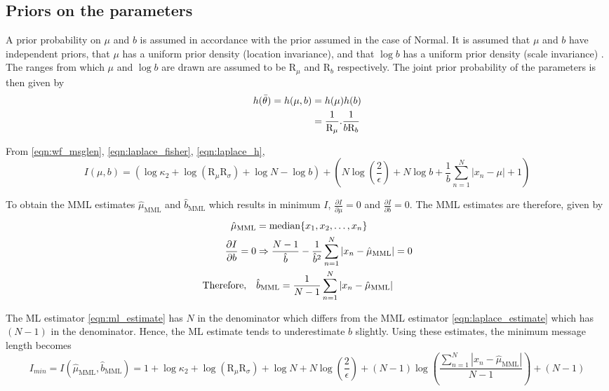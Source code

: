 \documentclass[wcp]{jmlr}
\begin{document}
\subsection*{Priors on the parameters}
A prior probability on $\mu$ and $b$ is assumed in accordance with the prior assumed
in the case of Normal. It is assumed that $\mu$ and $b$ have independent priors,
that $\mu$ has a uniform prior density (location invariance), and that $\log b$
has a uniform prior density (scale invariance) \citep{WallaceBook}.
The ranges from which $\mu$ and $\log b$ are drawn are assumed to be 
$\mathrm{R}_{\mu}$ and $\mathrm{R}_{b}$ respectively. The joint prior probability
of the parameters is then given by
\begin{align} 
  h(\bar{\theta}) = h(\mu,b) &= h(\mu) h(b) \notag\\
      &= \frac{1}{\mathrm{R}_{\mu}}. \frac{1}{b \mathrm{R}_{b}} \label{eqn:laplace_h} 
\end{align}

From \eqref{eqn:wf_msglen}, \eqref{eqn:laplace_fisher}, \eqref{eqn:laplace_h},
\begin{dmath*}
 I(\mu,b) = \left( \log\kappa_2 + \log(\mathrm{R}_{\mu}\mathrm{R}_{\sigma}) + \log N - \log b \right) + \left( N\log\left(\frac{2}{\epsilon}\right) + N\log b + \frac{1}{b}\sum_{n=1}^N |x_n-\mu| + 1 \right)
\end{dmath*} 

\noindent To obtain the MML estimates $\hat{\mu}_{\mathrm{MML}}$ and $\hat{b}_{\mathrm{MML}}$ 
which results in minimum $I$, $\frac{\partial I}{\partial \mu} = 0$ and 
$\frac{\partial I}{\partial b} = 0$. The MML estimates are therefore, given by
\begin{align}
  \hat{\mu}_{\mathrm{MML}} &= \mathrm{median}\{x_1,x_2,\ldots,x_n\} \notag\\
 \frac{\partial I}{\partial b} = 0 &\Rightarrow  \frac{N-1}{\hat{b}} - \frac{1}{\hat{b}^2}\sum_{n=1}^N |x_n-\hat{\mu}_{\textrm{MML}}| = 0 \notag\\
 \mathrm{Therefore,} \quad & \hat{b}_{\textrm{MML}} = \frac{1}{N-1} \sum_{n=1}^N |x_n-\hat{\mu}_{\textrm{MML}}|
  \label{eqn:laplace_estimate}
\end{align}

The ML estimator \eqref{eqn:ml_estimate} has $N$ in the denominator which differs from the MML
estimator \eqref{eqn:laplace_estimate} which has $(N-1)$ in the denominator. Hence, the ML
estimate tends to underestimate $b$ slightly. Using these estimates, the minimum message length becomes
\begin{dmath}
 I_{min} = I(\hat{\mu}_{\mathrm{MML}},\hat{b}_{\mathrm{MML}}) = 1 + \log\kappa_2 + \log(\mathrm{R}_{\mu}\mathrm{R}_{\sigma}) + \log N + N\log\left(\frac{2}{\epsilon}\right) + (N-1) \log \left( \frac{\sum_{n=1}^N |x_n-\hat{\mu}_{\mathrm{MML}}|}{N-1} \right) + (N-1) \label{eqn:laplace_mml_estimate}
\end{dmath} 
\end{document}
